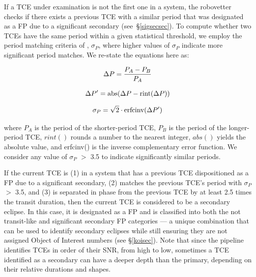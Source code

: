 If a TCE under examination is not the first one in a system, the robovetter checks if there exists a previous TCE with a similar period that was designated as a FP due to a significant secondary (see~\S\ref{sigsecsec}). To compute whether two TCEs have the same period within a given statistical threshold, we employ the period matching criteria of \citet[][see equations 1-3]{Coughlin2014a}, $\sigma_{P}$, where higher values of $\sigma_{P}$ indicate more significant period matches. We re-state the equations here as:

\begin{equation}
\label{peq1}
\Delta P = \frac{P_{A}-P_{B}}{P_{A}}\\
\end{equation}

\begin{equation}
\label{peq2}
\Delta P^{\prime} = \textrm{abs}(\Delta P - \textrm{rint}(\Delta P))\\
\end{equation}

\begin{equation}
\label{peq3}
\sigma_{P} = \sqrt{2}\cdot\textrm{erfcinv}(\Delta P^{\prime})\\
\end{equation}

\noindent where $P_{A}$ is the period of the shorter-period TCE, $P_{B}$ is the period of the longer-period TCE, $rint()$ rounds a number to the nearest integer, $abs()$ yields the absolute value, and erfcinv() is the inverse complementary error function. We consider any value of $\sigma_{P}$ $>$ 3.5 to indicate significantly similar periods.

If the current TCE is (1) in a system that has a previous TCE dispositioned as a FP due to a significant secondary, (2) matches the previous TCE's period with $\sigma_{P}$ $>$ 3.5, and (3) is separated in phase from the previous TCE by at least 2.5 times the transit duration, then the current TCE is considered to be a secondary eclipse. In this case, it is designated as a FP and is classified into both the not transit-like and significant secondary FP categories --- a unique combination that can be used to identify secondary eclipses while still ensuring they are not assigned \kepler{} Object of Interest numbers (see \S\ref{koisec}). Note that since the \kepler{} pipeline identifies TCEs in order of their SNR, from high to low, sometimes a TCE identified as a secondary can have a deeper depth than the primary, depending on their relative durations and shapes.

